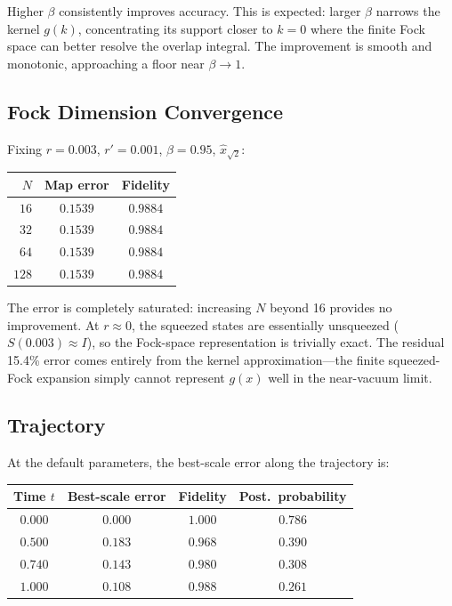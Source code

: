 \documentclass[11pt]{article}
\begin{document}
Higher $\beta$ consistently improves accuracy.  This is expected: larger
$\beta$ narrows the kernel $g(k)$, concentrating its support closer to
$k = 0$ where the finite Fock space can better resolve the overlap integral.
The improvement is smooth and monotonic, approaching a floor near
$\beta \to 1$.

\subsection{Fock Dimension Convergence}

Fixing $r = 0.003$, $r' = 0.001$, $\beta = 0.95$, $\hat{x}_{\sqrt{2}}$:

\begin{center}
\begin{tabular}{rcc}
  \toprule
  $N$ & Map error & Fidelity \\
  \midrule
  $16$ & $0.1539$ & $0.9884$ \\
  $32$ & $0.1539$ & $0.9884$ \\
  $64$ & $0.1539$ & $0.9884$ \\
  $128$ & $0.1539$ & $0.9884$ \\
  \bottomrule
\end{tabular}
\end{center}

The error is completely saturated: increasing $N$ beyond 16 provides no
improvement.  At $r \approx 0$, the squeezed states are essentially
unsqueezed ($S(0.003) \approx I$), so the Fock-space representation is
trivially exact.  The residual 15.4\% error comes entirely from the
kernel approximation---the finite squeezed-Fock expansion simply cannot
represent $g(x)$ well in the near-vacuum limit.

\subsection{Trajectory}

At the default parameters, the best-scale error along the trajectory is:

\begin{center}
\begin{tabular}{cccc}
  \toprule
  Time $t$ & Best-scale error & Fidelity & Post.\ probability \\
  \midrule
  $0.000$ & $0.000$ & $1.000$ & $0.786$ \\
  $0.500$ & $0.183$ & $0.968$ & $0.390$ \\
  $0.740$ & $0.143$ & $0.980$ & $0.308$ \\
  $1.000$ & $0.108$ & $0.988$ & $0.261$ \\
  \bottomrule
\end{tabular}
\end{center}
\end{document}
